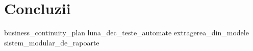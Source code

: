 \chapter{Concluzii}
{business_continuity_plan}
{luna_dec_teste_automate}
{extragerea_din_modele}
{sistem_modular_de_rapoarte}